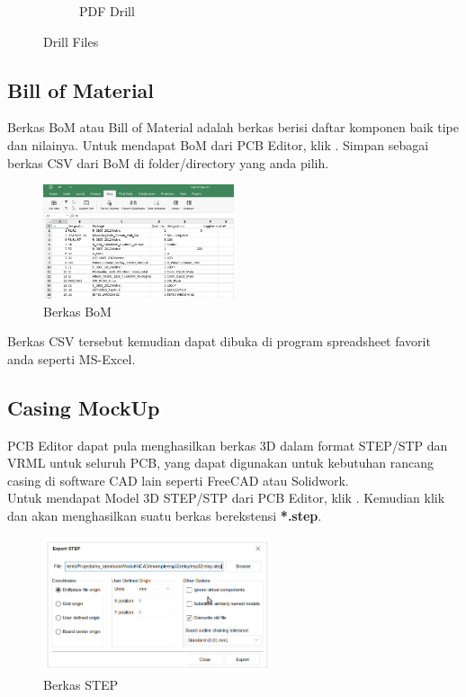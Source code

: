 \documentclass[12pt]{book}
\begin{document}
\begin{figure}[!ht]
\begin{subfigure}[t]{0.35\textwidth}
			\caption{PDF Drill}
		\end{subfigure}
		\caption{Drill Files}
	\end{figure}

	\subsection{Bill of Material}

	Berkas BoM atau Bill of Material adalah berkas berisi daftar komponen baik tipe dan nilainya.
	Untuk mendapat BoM dari PCB Editor, klik .
	Simpan sebagai berkas CSV dari BoM di folder/directory yang anda pilih.

	\begin{figure}[!ht]
		\centering
		\includegraphics[width=0.5\textwidth]{images/fab/fab_10}
		\caption{Berkas BoM}
	\end{figure}

	Berkas CSV tersebut kemudian dapat dibuka di program spreadsheet favorit anda seperti MS-Excel.

	\newpage
	\subsection{Casing MockUp}

	PCB Editor dapat pula menghasilkan berkas 3D dalam format STEP/STP dan VRML untuk seluruh PCB,
	yang dapat digunakan untuk kebutuhan rancang casing di software CAD lain seperti FreeCAD atau Solidwork.\\

	Untuk mendapat Model 3D STEP/STP dari PCB Editor, klik .
	Kemudian klik  dan akan menghasilkan suatu berkas berekstensi \textbf{*.step}.

	\begin{figure}[!ht]
		\centering
		\includegraphics[width=0.6\textwidth]{images/fab/fab_11}
		\caption{Berkas STEP}
	\end{figure}
\end{document}
